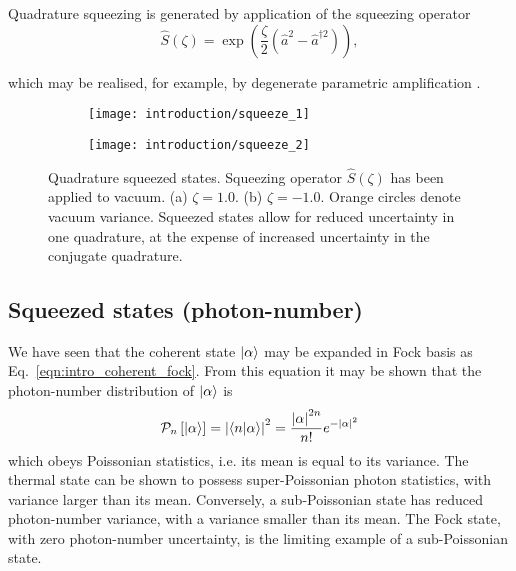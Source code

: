 Quadrature squeezing is generated by application of the squeezing operator
\begin{equation}
\hat{S}\left(\zeta\right) = \exp \left(\frac{\zeta}{2} \left(\hat{a}^2 - \hat{a}^{\dagger 2}\right) \right),
\end{equation}

\noindent which may be realised, for example, by degenerate parametric amplification \cite{Boyd2008}.


\begin{figure}[htp]
\centering
\captionsetup{width=0.8\linewidth}
	\begin{subfigure}{0.49\linewidth}
		\centering
		\texttt{[image: introduction/squeeze\_1]}
	\end{subfigure}
	\begin{subfigure}{0.49\linewidth}
		\centering
		\texttt{[image: introduction/squeeze\_2]}
	\end{subfigure}
\caption{\label{fig:intro_quadrature_squeezed_wigner} Quadrature squeezed states. Squeezing operator $\hat{S}\left(\zeta\right)$ has been applied to vacuum. (a) $\zeta = 1.0$. (b) $\zeta = -1.0$. Orange circles denote vacuum variance. Squeezed states allow for reduced uncertainty in one quadrature, at the expense of increased uncertainty in the conjugate quadrature.}
\end{figure}

\FloatBarrier
\subsection{Squeezed states (photon-number)}
We have seen that the coherent state $\ket{\alpha}$ may be expanded in Fock basis as Eq.~\ref{eqn:intro_coherent_fock}. From this equation it may be shown that the photon-number distribution of $\ket{\alpha}$ is 
\begin{equation}
\mathcal{P}_n\left[\ket{\alpha}\right] = \left| \ip{n}{\alpha} \right|^2 = \frac{\left|\alpha\right|^{2n}}{n!} e^{-\left|\alpha\right|^2}
\end{equation}
which obeys Poissonian statistics, i.e. its mean is equal to its variance. The thermal state can be shown to possess super-Poissonian photon statistics, with variance larger than its  mean. Conversely, a sub-Poissonian state has reduced photon-number variance, with a variance smaller than its mean. The Fock state, with zero photon-number uncertainty, is the limiting example of a sub-Poissonian state.

